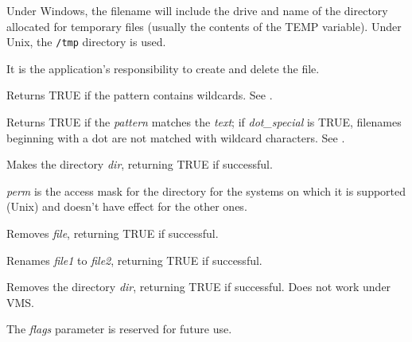Under Windows, the filename will include the drive and name of the
directory allocated for temporary files (usually the contents of the
TEMP variable). Under Unix, the {\tt /tmp} directory is used.

It is the application's responsibility to create and delete the file.

\label{wxiswild}


Returns TRUE if the pattern contains wildcards. See .

\label{wxmatchwild}


Returns TRUE if the {\it pattern}\/ matches the {\it text}\/; if {\it
dot\_special}\/ is TRUE, filenames beginning with a dot are not matched
with wildcard characters. See .



Makes the directory {\it dir}, returning TRUE if successful.

{\it perm} is the access mask for the directory for the systems on which it is
supported (Unix) and doesn't have effect for the other ones.



Removes {\it file}, returning TRUE if successful.



Renames {\it file1} to {\it file2}, returning TRUE if successful.



Removes the directory {\it dir}, returning TRUE if successful. Does not work under VMS.

The {\it flags} parameter is reserved for future use.

